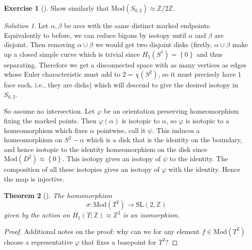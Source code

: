 \documentclass[reqno]{amsart}
\newtheorem{theorem}{Theorem}[section]
\theoremstyle{definition}
\newtheorem{exercise}[theorem]{Exercise}
\theoremstyle{remark}
\newtheorem*{solution}{Solution}
\newcommand{\SL}{{\mathrm{SL}}}
\newcommand{\Mod}{{\mathrm{Mod}}}
\begin{document}
\begin{exercise}[]
    Show similarly that $\Mod \left( S_{0,2} \right) \approx
    \mathbb{Z}/ 2\mathbb{Z}$.
\end{exercise}


\begin{solution}
    Let $\alpha, \beta$ be arcs with the same distinct
    marked endpoints. Equivalently to before, we can reduce
    bigons by isotopy until $\alpha$ and $\beta$ are disjoint.
    Then removing $\alpha \cup  \beta$ we would get
    two disjoint disks (firstly, $\alpha \cup \beta$ 
    make up a closed simple curve which is trivial since
    $H_1 \left( S^{1} \right) = \left\{ 0 \right\} $ and
    thus separating. Therefore we get a disconnected
    space with as many vertices as edges whose
    Euler characteristic must add to
    $2 = \chi \left( S^{2} \right) $, so
    it must precisely have $1$ face each, i.e., they are disks)
    which will descend to give the desired
    isotopy in $S_{0,2}$.
    
    So assume no intersection. Let $\varphi$ be an orientation
    preserving homeomorphism fixing the marked points. Then
     $\varphi \left( \alpha \right) $ is isotopic
     to $\alpha$, so $\varphi$ is isotopic to a homeomorphism which
     fixes $\alpha$ pointwise, call it $\psi$.
     This induces a homeomorphism on $S^{2} - \alpha$ which
     is a disk that is the identity on the boundary, and hence
     isotopic to the identity homeomorphism on the disk
     since $\Mod \left( D^2 \right) \approx \left\{ 0 \right\} $.
     This isotopy gives an isotopy of $ \psi$ to the identity.
     The composition of all these
     isotopies gives an isotopy of 
     $\varphi$ with the identity.
     Hence the map is injective.
\end{solution}



\begin{theorem}[]\label{mcg-of-torus}
    The homomorphism
    \[
    \sigma \colon \Mod \left( T^2 \right) \to 
    \SL \left( 2, \mathbb{Z} \right) 
    \] 
    given by the action on $H_1 \left( T ;\mathbb{Z} \right) 
    \approx \mathbb{Z}^2$ is an isomorphism.
\end{theorem}

\begin{proof}
    Additional notes on the proof:
    why can we for any element $f \in \Mod \left( T^2 \right) $ 
    choose a representative $\varphi $ that fixes a basepoint
    for $T^2$?
\end{proof}
\end{document}
